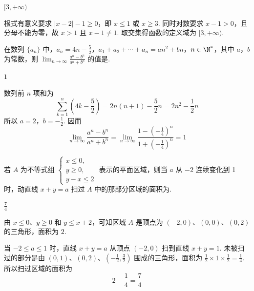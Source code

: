 \begin{answer}
\( [3, +\infty) \)
\end{answer}

\begin{solution}
根式有意义要求 \(|x-2|-1\geqslant0\)，即 \(x\leqslant1\) 或 \(x\geqslant3\). 同时对数要求 \(x-1>0\)，且分母不能为零，故 \(x>1\) 且 \(x-1\neq1\). 取交集得函数的定义域为 \([3,+\infty)\).
\end{solution}

\begin{problem}
在数列 \(\{a_{n}\}\) 中，\(a_{n} = 4n - \frac{5}{2}\)，\(a_{1} + a_{2} + \cdots + a_{n} = an^{2} + bn\)，\(n \in \N^*\)，其中 \(a\)，\(b\) 为常数，则 \(\displaystyle\lim_{n \to \infty} \frac{a^{n} - b^{n}}{a^{n} + b^{n}}\) 的值是\fillinblank{}.
\end{problem}

\begin{answer}
\(1\)
\end{answer}

\begin{solution}
数列前 \(n\) 项和为
\[
\sum_{k=1}^{n}\left(4k-\frac52\right)=2n(n+1)-\frac52n=2n^2-\frac12n
\]
所以 \(a=2\)，\(b=-\frac12\). 因而
\[
\lim_{n\to\infty}\frac{a^n-b^n}{a^n+b^n}
=\lim_{n\to\infty}\frac{1-\left(-\frac14\right)^n}{1+\left(-\frac14\right)^n}=1
\]
\end{solution}

\begin{problem}
若 \(A\) 为不等式组 \(\begin{cases}
x \leqslant 0,\\
y \geqslant 0,\\
y - x \leqslant 2
\end{cases}\) 表示的平面区域，则当 \(a\) 从 \(-2\) 连续变化到 1 时，动直线 \(x + y = a\) 扫过 \(A\) 中的那部分区域的面积为\fillinblank{}.
\end{problem}

\begin{answer}
\(\frac{7}{4}\)
\end{answer}

\begin{solution}
由 \(x\leqslant0\)、\(y\geqslant0\) 和 \(y\leqslant x+2\)，可知区域 \(A\) 是顶点为 \((-2,0)\)、\((0,0)\)、\((0,2)\) 的三角形，面积为 \(2\).

当 \(-2\leqslant a\leqslant1\) 时，直线 \(x+y=a\) 从顶点 \((-2,0)\) 扫到直线 \(x+y=1\). 未被扫过的部分是由 \((0,1)\)、\((0,2)\)、\(\left(-\frac12,\frac32\right)\) 围成的三角形，面积为 \(\frac12\times1\times\frac12=\frac14\). 所以扫过区域的面积为
\[
2-\frac14=\frac74
\]
\end{solution}

